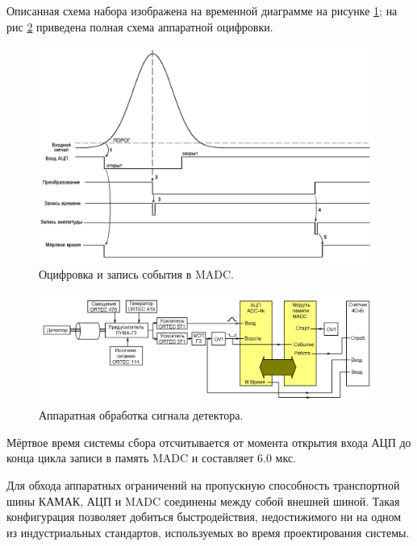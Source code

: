 \documentclass[a4paper,14pt]{extreport}
\begin{document}
Описанная схема набора изображена на временной диаграмме на рисунке \ref{fig:numass-madc-timeline}; на рис \ref{fig:numass-madc-signal-processing} приведена полная схема аппаратной оцифровки.

\begin{figure}
  \centering
  \includegraphics[width = 0.98\textwidth]{img/nu_mass_setup/madc_timeline.png}
    \caption{Оцифровка и запись события в MADC.}
    \label{fig:numass-madc-timeline}
\end{figure}

\begin{figure}
  \centering
  \includegraphics[width = 0.98\textwidth]{img/nu_mass_setup/madc_signal_processing.png}
    \caption{Аппаратная обработка сигнала детектора.}
    \label{fig:numass-madc-signal-processing}
\end{figure}

Мёртвое время системы сбора отсчитывается от момента открытия входа АЦП до конца     цикла записи в память MADC и составляет 6.0 мкс.

Для обхода аппаратных ограничений на пропускную способность транспортной шины КАМАК, АЦП и MADC соединены между собой внешней шиной. Такая конфигурация позволяет добиться быстродействия, недостижимого ни на одном из индустриальных стандартов, используемых во время проектирования системы.
\end{document}
